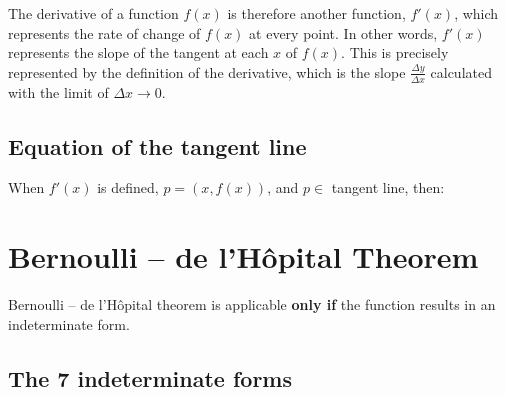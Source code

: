 \documentclass{article}
\begin{document}
\begin{minipage}{0.5\textwidth}
\end{minipage}
\begin{minipage}{0.5\textwidth}
The derivative of a function \(f(x)\) is therefore another function, \(f'(x)\), which
represents the rate of change of \(f(x)\) at every point. In other words, \(f'(x)\)
represents the slope of the tangent at each \(x\) of \(f(x)\).
This is precisely represented by the definition of the derivative, which is the slope
\(\frac{\Delta y}{\Delta x}\) calculated with the limit of \(\Delta x \to 0\).
\end{minipage}

\subsection{Equation of the tangent line}
When $f'(x)$ is defined, $p = \left(x, f(x)\right)$, and $p \in$ tangent line, then:

\section{Bernoulli -- de l'Hôpital Theorem}
Bernoulli -- de l'Hôpital theorem is applicable \textbf{only if} the function
results in an indeterminate form.

\subsection{The 7 indeterminate forms}
\end{document}
